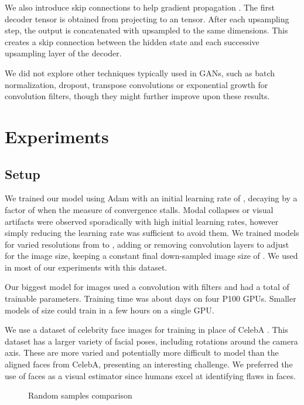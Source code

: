 \documentclass[english]{article}
\begin{document}
We also introduce skip connections \cite{he2016deep,srivastava2015highway,huang2016densely}
to help gradient propagation \cite{bengio1994learning}. The first
decoder tensor  is obtained from projecting  to an 
tensor. After each upsampling step, the output is concatenated with
 upsampled to the same dimensions. This creates a skip connection
between the hidden state and each successive upsampling layer of the
decoder.

We did not explore other techniques typically used in GANs, such as
batch normalization, dropout, transpose convolutions or exponential
growth for convolution filters, though they might further improve
upon these results. 


\section{Experiments}


\subsection{Setup}

We trained our model using Adam with an initial learning rate of ,
decaying by a factor of  when the measure of convergence stalls.
Modal collapses or visual artifacts were observed sporadically with
high initial learning rates, however simply reducing the learning
rate was sufficient to avoid them. We trained models for varied resolutions
from  to , adding or removing convolution layers to adjust
for the image size, keeping a constant final down-sampled image size
of . We used  in most of our experiments
with this dataset.

Our biggest model for  images used a convolution with
 filters and had a total of  trainable
parameters. Training time was about  days on four P100 GPUs.
Smaller models of size  could train in a few hours on
a single GPU.

We use a dataset of  celebrity face images for training in
place of CelebA \cite{liu2015faceattributes_celeba}. This dataset
has a larger variety of facial poses, including rotations around the
camera axis. These are more varied and potentially more difficult
to model than the aligned faces from CelebA, presenting an interesting
challenge. We preferred the use of faces as a visual estimator since
humans excel at identifying flaws in faces.
\begin{figure}
\begin{centering}
\enskip{}
\par\end{centering}

\centering{}\caption{Random samples comparison \label{fig:rand}}
\end{figure}
\end{document}
